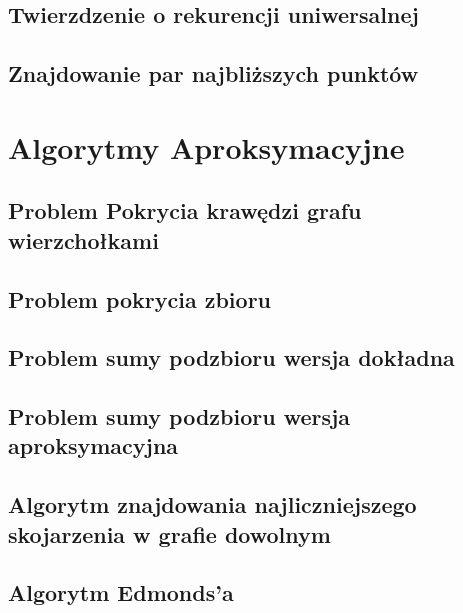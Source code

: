 \documentclass[11pt,a4paper]{article}
\begin{document}
\subsection{Twierzdzenie o rekurencji uniwersalnej}


\subsection{Znajdowanie par najbliższych punktów}


\section{Algorytmy Aproksymacyjne}


\subsection{Problem Pokrycia krawędzi grafu wierzchołkami}


\subsection{Problem pokrycia zbioru}


\subsection{Problem sumy podzbioru wersja dokładna}


\subsection{Problem sumy podzbioru wersja aproksymacyjna}


\subsection{Algorytm znajdowania najliczniejszego skojarzenia w grafie dowolnym}


\subsection{Algorytm Edmonds'a}

\end{document}
